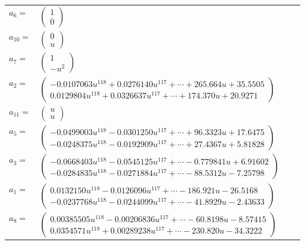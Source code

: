 \documentclass[1p]{elsarticle_modified}
\theoremstyle{definition}
\begin{document}
\begin{tabular}{m{7pt} m{180pt} m{7pt} m{180pt} }
\flushright $a_{6}=$&$\begin{pmatrix}1\\0\end{pmatrix}$ \\
\flushright $a_{10}=$&$\begin{pmatrix}0\\u\end{pmatrix}$ \\
\flushright $a_{7}=$&$\begin{pmatrix}1\\- u^2\end{pmatrix}$ \\
\flushright $a_{2}=$&$\begin{pmatrix}-0.0107063 u^{118}+0.0276140 u^{117}+\cdots+265.664 u+35.5505\\0.0129804 u^{118}+0.0326637 u^{117}+\cdots+174.370 u+20.9271\end{pmatrix}$ \\
\flushright $a_{11}=$&$\begin{pmatrix}u\\u\end{pmatrix}$ \\
\flushright $a_{5}=$&$\begin{pmatrix}-0.0499003 u^{118}-0.0301250 u^{117}+\cdots+96.3323 u+17.6475\\-0.0248375 u^{118}-0.0192909 u^{117}+\cdots+27.4367 u+5.81828\end{pmatrix}$ \\
\flushright $a_{3}=$&$\begin{pmatrix}-0.0668403 u^{118}-0.0545125 u^{117}+\cdots-0.779841 u+6.91602\\-0.0284835 u^{118}-0.0271884 u^{117}+\cdots-88.5312 u-7.25798\end{pmatrix}$ \\
\flushright $a_{1}=$&$\begin{pmatrix}0.0132150 u^{118}-0.0126096 u^{117}+\cdots-186.921 u-26.5168\\-0.0237768 u^{118}-0.0244099 u^{117}+\cdots-41.8929 u-2.43633\end{pmatrix}$ \\
\flushright $a_{8}=$&$\begin{pmatrix}0.00385505 u^{118}-0.00206836 u^{117}+\cdots-60.8198 u-8.57415\\0.0354571 u^{118}+0.00289238 u^{117}+\cdots-230.820 u-34.3222\end{pmatrix}$ \\

\end{tabular}
\end{document}
